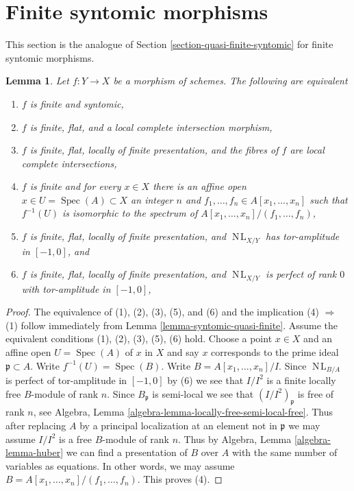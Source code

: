 \documentclass{stacks-project}
\theoremstyle{plain}
\newtheorem{lemma}[subsection]{Lemma}
\theoremstyle{definition}
\theoremstyle{remark}
\numberwithin{equation}{subsection}
\def\Spec{\mathop{\mathrm{Spec}}}
\def\NL{\mathop{N\!L}\nolimits}
\begin{document}
\section{Finite syntomic morphisms}
\label{section-finite-syntomic}

\noindent
This section is the analogue of Section \ref{section-quasi-finite-syntomic}
for finite syntomic morphisms.

\begin{lemma}
\label{lemma-syntomic-finite}
Let $f : Y \to X$ be a morphism of schemes. The following are equivalent
\begin{enumerate}
\item $f$ is finite and syntomic,
\item $f$ is finite, flat, and a local complete intersection morphism,
\item $f$ is finite, flat, locally of finite presentation,
and the fibres of $f$ are local complete intersections,
\item $f$ is finite and for every $x \in X$ there is an
affine open $x \in U = \Spec(A) \subset X$ an integer $n$
and $f_1, \ldots, f_n \in A[x_1, \ldots, x_n]$ such that
$f^{-1}(U)$ is isomorphic to the spectrum of
$A[x_1, \ldots, x_n]/(f_1, \ldots, f_n)$,
\item $f$ is finite, flat, locally of finite presentation,
and $\NL_{X/Y}$ has tor-amplitude in $[-1, 0]$, and
\item $f$ is finite, flat, locally of finite presentation, and
$\NL_{X/Y}$ is perfect of rank $0$ with tor-amplitude in $[-1, 0]$,
\end{enumerate}
\end{lemma}

\begin{proof}
The equivalence of (1), (2), (3), (5), and (6)
and the implication (4) $\Rightarrow$ (1) follow immediately
from Lemma \ref{lemma-syntomic-quasi-finite}. Assume the equivalent conditions
(1), (2), (3), (5), (6) hold.
Choose a point $x \in X$ and an affine open $U = \Spec(A)$
of $x$ in $X$ and say $x$ corresponds to the prime ideal
$\mathfrak p \subset A$. Write $f^{-1}(U) = \Spec(B)$.
Write $B = A[x_1, \ldots, x_n]/I$. Since $\NL_{B/A}$
is perfect of tor-amplitude in $[-1, 0]$ by (6)
we see that $I/I^2$ is a finite locally free $B$-module
of rank $n$. Since $B_\mathfrak p$ is semi-local we see that
$(I/I^2)_\mathfrak p$ is free of rank $n$, see
Algebra, Lemma \ref{algebra-lemma-locally-free-semi-local-free}.
Thus after replacing $A$ by a principal localization at
an element not in $\mathfrak p$ we may assume $I/I^2$
is a free $B$-module of rank $n$.
Thus by Algebra, Lemma \ref{algebra-lemma-huber}
we can find a presentation of $B$ over $A$
with the same number of variables as equations. In other words,
we may assume $B = A[x_1, \ldots, x_n]/(f_1, \ldots, f_n)$.
This proves (4).
\end{proof}
\end{document}
